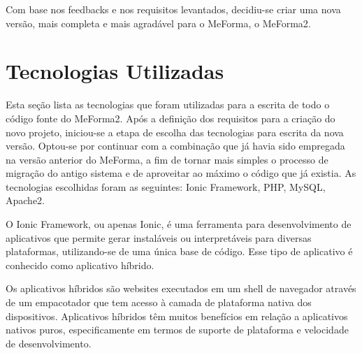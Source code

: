Com base nos feedbacks e nos requisitos levantados, decidiu-se criar uma nova versão, mais completa e mais agradável para o MeForma, o MeForma2.

\section{Tecnologias Utilizadas}
\label{tecnologias}
Esta seção lista as tecnologias que foram utilizadas para a escrita de todo o código fonte do MeForma2. Após a definição dos requisitos para a criação do novo projeto, iniciou-se a etapa de escolha das tecnologias para escrita da nova versão. Optou-se por continuar com a combinação que já havia sido empregada na versão anterior do MeForma, a fim de tornar mais simples o processo de migração do antigo sistema e de aproveitar ao máximo o código que já existia. As tecnologias escolhidas foram as seguintes: Ionic Framework, PHP, MySQL, Apache2.

O Ionic Framework, ou apenas Ionic, é uma ferramenta para desenvolvimento de aplicativos que permite gerar instaláveis ou interpretáveis para diversas plataformas, utilizando-se de uma única base de código. Esse tipo de aplicativo é conhecido como aplicativo híbrido.

Os aplicativos híbridos são websites executados em um shell de navegador através de um empacotador que tem acesso à camada de plataforma nativa dos dispositivos. Aplicativos híbridos têm muitos benefícios em relação a aplicativos nativos puros, especificamente em termos de suporte de plataforma e velocidade de desenvolvimento.

